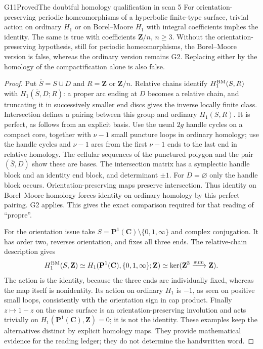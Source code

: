 \begin{result}{G11}{Proved}{The doubtful homology qualification in scan 5}
For orientation-preserving periodic homeomorphisms of a hyperbolic
finite-type surface, trivial action on ordinary $H_1$ or on
Borel--Moore $H_1$ with integral coefficients implies the identity.
The same is true with coefficients $\mathbf Z/n$, $n\geq3$.
Without the orientation-preserving hypothesis, still for periodic
homeomorphisms, the Borel--Moore version is false, whereas the ordinary
version remains G2. Replacing either by the
homology of the compactification alone is also false.
\end{result}
\begin{proof}
Put $\overline S=S\cup D$ and $R=\mathbf Z$ or $\mathbf Z/n$.
Relative chains identify $H_1^{\rm BM}(S,R)$ with
$H_1(\overline S,D;R)$: a proper arc ending at $D$ becomes a
relative chain, and truncating it in successively smaller end discs
gives the inverse locally finite class. Intersection defines a pairing
between this group and ordinary $H_1(S,R)$. It is perfect, as follows
from an explicit basis. Use the usual $2g$ handle cycles on a compact
core, together with $\nu-1$ small puncture loops in ordinary homology;
use the handle cycles and $\nu-1$ arcs from the first $\nu-1$ ends
to the last end in relative homology. The cellular sequences of the
punctured polygon and the pair $(\overline S,D)$ show these are bases.
The intersection matrix has a symplectic handle block and an identity
end block, and determinant $\pm1$. For $D=\varnothing$ only the
handle block occurs. Orientation-preserving maps preserve intersection.
Thus identity on Borel--Moore homology forces identity on ordinary
homology by this perfect pairing. G2 applies. This gives the exact
comparison required for that reading of ``propre''.

For the orientation issue take
$S=\mathbf P^1(\mathbf C)\setminus\{0,1,\infty\}$ and complex
conjugation. It has order two, reverses orientation, and fixes all
three ends. The relative-chain description gives
\[
 H_1^{\rm BM}(S,\mathbf Z)
   \simeq H_1(\mathbf P^1(\mathbf C),\{0,1,\infty\};\mathbf Z)
   \simeq\ker(\mathbf Z^3\xrightarrow{\mathrm{sum}}\mathbf Z).
\]
The action is the identity, because the three ends are individually
fixed, whereas the map itself is nonidentity. Its action on ordinary
$H_1$ is $-1$, as seen on positive small loops, consistently with the
orientation sign in cap product.
Finally $z\mapsto1-z$ on the same surface is an orientation-preserving
involution and acts trivially on
$H_1(\mathbf P^1(\mathbf C),\mathbf Z)=0$; it is not the identity.
These examples keep the alternatives distinct by explicit homology
maps. They provide mathematical evidence for the reading ledger;
they do not determine the handwritten word.
\end{proof}
